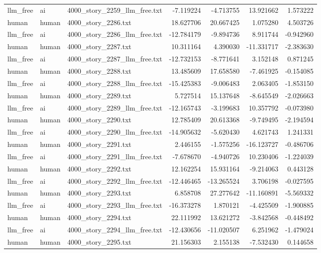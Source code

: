 \begin{longtable}{lllrrrr}
llm\_free & ai & 4000\_story\_2259\_llm\_free.txt & -7.119224 & -4.713755 & 13.921662 & 1.573222 \\
human & human & 4000\_story\_2286.txt & 18.627706 & 20.667425 & 1.075280 & 4.503726 \\
llm\_free & ai & 4000\_story\_2286\_llm\_free.txt & -12.784179 & -9.894736 & 8.911744 & -0.942960 \\
human & human & 4000\_story\_2287.txt & 10.311164 & 4.390030 & -11.331717 & -2.383630 \\
llm\_free & ai & 4000\_story\_2287\_llm\_free.txt & -12.732153 & -8.771641 & 3.152148 & 0.871245 \\
human & human & 4000\_story\_2288.txt & 13.485609 & 17.658580 & -7.461925 & -0.154085 \\
llm\_free & ai & 4000\_story\_2288\_llm\_free.txt & -15.425383 & -9.006483 & 2.063405 & -1.853150 \\
human & human & 4000\_story\_2289.txt & 5.727514 & 15.137648 & -8.645549 & -2.026663 \\
llm\_free & ai & 4000\_story\_2289\_llm\_free.txt & -12.165743 & -3.199683 & 10.357792 & -0.073980 \\
human & human & 4000\_story\_2290.txt & 12.785409 & 20.613368 & -9.749495 & -2.194594 \\
llm\_free & ai & 4000\_story\_2290\_llm\_free.txt & -14.905632 & -5.620430 & 4.621743 & 1.241331 \\
human & human & 4000\_story\_2291.txt & 2.446155 & -1.575256 & -16.123727 & -0.486706 \\
llm\_free & ai & 4000\_story\_2291\_llm\_free.txt & -7.678670 & -4.940726 & 10.230406 & -1.224039 \\
human & human & 4000\_story\_2292.txt & 12.162254 & 15.931164 & -9.214063 & 0.443128 \\
llm\_free & ai & 4000\_story\_2292\_llm\_free.txt & -12.446465 & -13.265524 & 3.706198 & -0.027595 \\
human & human & 4000\_story\_2293.txt & 6.858708 & 27.277642 & -11.160891 & -5.569332 \\
llm\_free & ai & 4000\_story\_2293\_llm\_free.txt & -16.373278 & 1.870121 & -4.425509 & -1.900885 \\
human & human & 4000\_story\_2294.txt & 22.111992 & 13.621272 & -3.842568 & -0.448492 \\
llm\_free & ai & 4000\_story\_2294\_llm\_free.txt & -12.430656 & -11.020507 & 6.251962 & -1.479024 \\
human & human & 4000\_story\_2295.txt & 21.156303 & 2.155138 & -7.532430 & 0.144658 \\

\end{longtable}
